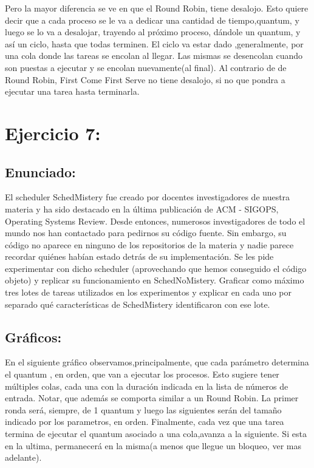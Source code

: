 \documentclass[10pt, a4paper]{article}
\begin{document}
Pero la mayor diferencia se ve en que el Round Robin, tiene desalojo. Esto quiere decir que a cada proceso se le va a dedicar una cantidad de tiempo,quantum, y luego se lo va a desalojar, trayendo al próximo proceso, dándole un quantum, y así un ciclo, hasta que todas  terminen. El ciclo va estar dado ,generalmente, por una cola donde las tareas se encolan al llegar. Las mismas se desencolan cuando son puestas a ejecutar y se encolan nuevamente(al final). Al contrario de de Round Robin, First Come First Serve no tiene desalojo, si no que pondra a ejecutar una tarea hasta terminarla.


\section{Ejercicio 7:}

\subsection{Enunciado:}
El scheduler SchedMistery fue creado por docentes investigadores de nuestra
materia y ha sido destacado en la última publicación de ACM - SIGOPS, Operating Systems
Review. Desde entonces, numerosos investigadores de todo el mundo nos han contactado para
pedirnos su código fuente. Sin embargo, su código no aparece en ninguno de los repositorios
de la materia y nadie parece recordar quiénes habían estado detrás de su implementación.
Se les pide experimentar con dicho scheduler (aprovechando que hemos conseguido el código objeto) y replicar su funcionamiento en SchedNoMistery. Graficar como máximo tres lotes
de tareas utilizados en los experimentos y explicar en cada uno por separado qué características de SchedMistery identificaron con ese lote.


\subsection{Gráficos:}

En el siguiente gráfico observamos,principalmente, que  cada parámetro determina el quantum , en orden, que van a ejecutar los procesos. Esto sugiere tener múltiples colas, cada una con la duración indicada en la lista de números de entrada. Notar, que además se comporta similar a un Round Robin. La primer ronda será, siempre, de 1 quantum y luego las siguientes serán del tamaño indicado por los parametros, en orden. 
Finalmente, cada vez que una tarea termina de ejecutar el quantum asociado a una cola,avanza a la siguiente. Si esta en la ultima, permanecerá en la misma(a menos que llegue un bloqueo, ver mas adelante).
\end{document}
